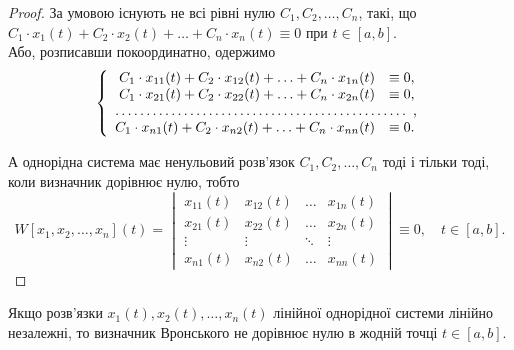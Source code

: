 \begin{proof}
	За умовою існують не всі рівні нулю $C_1, C_2, \ldots, C_n$, такі, що $C_1 \cdot x_1(t) + C_2 \cdot x_2(t) + \ldots + C_n \cdot x_n(t) \equiv 0$ при $t \in [a, b]$. \\

	Або, розписавши покоординатно, одержимо
	\begin{equation*}
		\left\{
			\begin{array}{rl}
				C_1 \cdot x_{11}(t) + C_2 \cdot x_{12}(t) + \ldots + C_n \cdot x_{1n}(t) &\equiv 0, \\
				C_1 \cdot x_{21}(t) + C_2 \cdot x_{22}(t) + \ldots + C_n \cdot x_{2n}(t) &\equiv 0, \\
				\hdotsfor{2}, \\
				C_1 \cdot x_{n1}(t) + C_2 \cdot x_{n2}(t) + \ldots + C_n \cdot x_{nn}(t) &\equiv 0.
			\end{array}
		\right.
	\end{equation*}

	А однорідна система має ненульовий розв'язок $C_1, C_2, \ldots, C_n$ тоді і тільки тоді, коли визначник дорівнює нулю, тобто
	\begin{equation*}
		W[x_1, x_2, \ldots, x_n](t) = \begin{vmatrix} x_{11}(t) & x_{12}(t) & \ldots & x_{1n}(t) \\ x_{21}(t) & x_{22}(t) & \ldots & x_{2n}(t) \\ \vdots & \vdots & \ddots & \vdots \\ x_{n1}(t) & x_{n2}(t) & \ldots & x_{nn}(t) \end{vmatrix} \equiv 0, \quad t \in [a, b].
	\end{equation*}
\end{proof}

\begin{theorem}
	Якщо розв'язки $x_1(t), x_2(t), \ldots, x_n(t)$ лінійної однорідної системи лінійно незалежні, то визначник Вронського не дорівнює нулю в жодній точці $t \in [a, b]$. 
\end{theorem}

